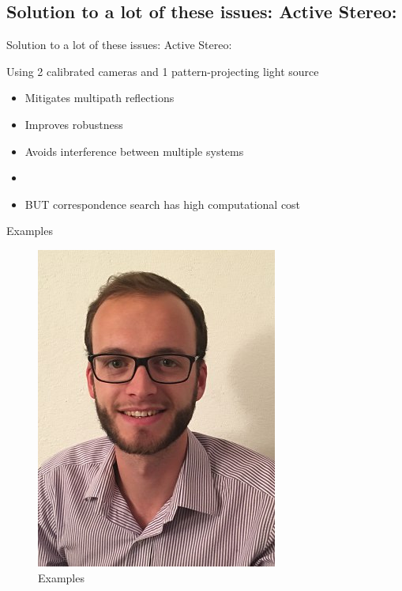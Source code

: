 \subsection{Solution to a lot of these issues: Active Stereo:}
\begin{frame}{Solution to a lot of these issues: Active Stereo:}

Using 2 calibrated cameras and 1 pattern-projecting light source

\begin{itemize}
\item Mitigates multipath reflections
\item Improves robustness
\item Avoids interference between multiple systems
\item
\item BUT correspondence search has high computational cost
\end{itemize}

\end{frame}

\begin{frame}{Examples}
\begin{figure}
\includegraphics[scale=0.9]{pictures/polop}
\caption{Examples}
\end{figure}
\end{frame}
